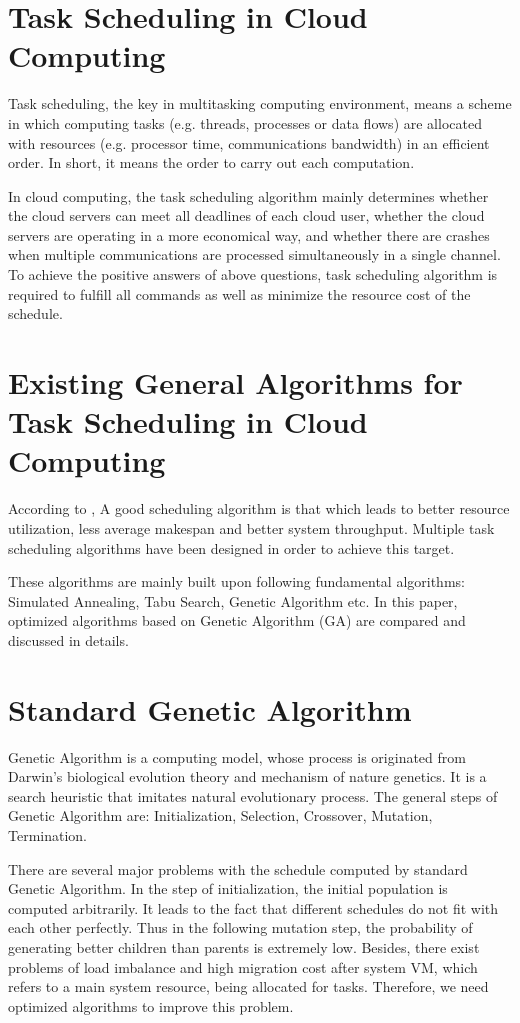 \documentclass[10pt,twoside,openright,logo]{report}
\begin{document}
\section{Task Scheduling in Cloud Computing}
Task scheduling, the key in multitasking computing environment, means a scheme in which computing tasks (e.g. threads, processes or data flows) are allocated with resources (e.g. processor time, communications bandwidth) in an efficient order. In short, it means the order to carry out each computation.

In cloud computing, the task scheduling algorithm mainly determines whether the cloud servers can meet all deadlines of each cloud user, whether the cloud servers are operating in a more economical way, and whether there are crashes when multiple communications are processed simultaneously in a single channel. To achieve the positive answers of above questions, task scheduling algorithm is required to fulfill all commands as well as minimize the resource cost of the schedule.

\section{Existing General Algorithms for Task Scheduling in Cloud Computing}
According to \cite{3}, A good scheduling algorithm is that which leads to better resource utilization, less average makespan and better system throughput. Multiple task scheduling algorithms have been designed in order to achieve this target.

These algorithms are mainly built upon following fundamental algorithms: Simulated Annealing, Tabu Search, Genetic Algorithm etc. In this paper, optimized algorithms based on Genetic Algorithm (GA) are compared and discussed in details.

\section{Standard Genetic Algorithm}
Genetic Algorithm is a computing model, whose process is originated from Darwin's biological evolution theory and mechanism of nature genetics. It is a search heuristic that imitates natural evolutionary process.
The general steps of Genetic Algorithm are: Initialization, Selection, Crossover, Mutation, Termination.

There are several major problems with the schedule computed by standard Genetic Algorithm.
In the step of initialization, the initial population is computed arbitrarily. It leads to the fact that different schedules do not fit with each other perfectly. Thus in the following mutation step, the probability of generating better children than parents is extremely low.
Besides, there exist problems of load imbalance and high migration cost after system VM, which refers to a main system resource, being allocated for tasks.
Therefore, we need optimized algorithms to improve this problem.
\end{document}
